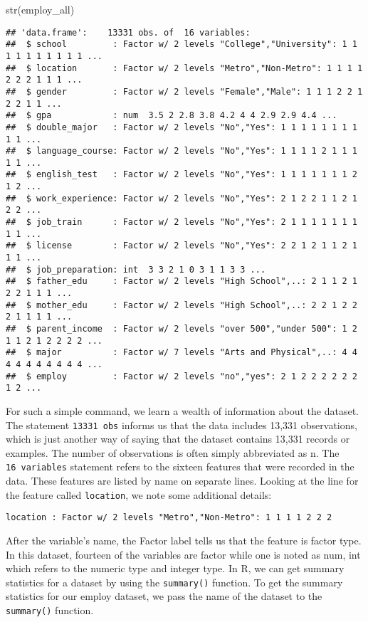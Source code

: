 \documentclass[
]{book}
\newenvironment{Shaded}{\begin{snugshade}}{\end{snugshade}}
\newcommand{\FunctionTok}[1]{\textcolor[rgb]{0.00,0.00,0.00}{#1}}
\newcommand{\NormalTok}[1]{#1}
\begin{document}
\begin{Shaded}
\begin{Highlighting}[]
\FunctionTok{str}\NormalTok{(employ\_all)}
\end{Highlighting}
\end{Shaded}

\begin{verbatim}
## 'data.frame':    13331 obs. of  16 variables:
##  $ school         : Factor w/ 2 levels "College","University": 1 1 1 1 1 1 1 1 1 1 ...
##  $ location       : Factor w/ 2 levels "Metro","Non-Metro": 1 1 1 1 2 2 2 1 1 1 ...
##  $ gender         : Factor w/ 2 levels "Female","Male": 1 1 1 2 2 1 2 2 1 1 ...
##  $ gpa            : num  3.5 2 2.8 3.8 4.2 4 4 2.9 2.9 4.4 ...
##  $ double_major   : Factor w/ 2 levels "No","Yes": 1 1 1 1 1 1 1 1 1 1 ...
##  $ language_course: Factor w/ 2 levels "No","Yes": 1 1 1 1 2 1 1 1 1 1 ...
##  $ english_test   : Factor w/ 2 levels "No","Yes": 1 1 1 1 1 1 1 2 1 2 ...
##  $ work_experience: Factor w/ 2 levels "No","Yes": 2 1 2 2 1 1 2 1 2 2 ...
##  $ job_train      : Factor w/ 2 levels "No","Yes": 2 1 1 1 1 1 1 1 1 1 ...
##  $ license        : Factor w/ 2 levels "No","Yes": 2 2 1 2 1 1 2 1 1 1 ...
##  $ job_preparation: int  3 3 2 1 0 3 1 1 3 3 ...
##  $ father_edu     : Factor w/ 2 levels "High School",..: 2 1 1 2 1 2 2 1 1 1 ...
##  $ mother_edu     : Factor w/ 2 levels "High School",..: 2 2 1 2 2 2 1 1 1 1 ...
##  $ parent_income  : Factor w/ 2 levels "over 500","under 500": 1 2 1 1 2 1 2 2 2 2 ...
##  $ major          : Factor w/ 7 levels "Arts and Physical",..: 4 4 4 4 4 4 4 4 4 4 ...
##  $ employ         : Factor w/ 2 levels "no","yes": 2 1 2 2 2 2 2 2 1 2 ...
\end{verbatim}

For such a simple command, we learn a wealth of information about the dataset.
The statement \texttt{13331\ obs} informs us that the data includes 13,331 observations, which is just another way of saying that the dataset contains 13,331 records or examples. The number of observations is often simply abbreviated as n.
The \texttt{16\ variables} statement refers to the sixteen features that were recorded in the data. These features are listed by name on separate lines. Looking at the line for the feature called \texttt{location}, we note some additional details:

\texttt{location\ :\ Factor\ w/\ 2\ levels\ "Metro","Non-Metro":\ 1\ 1\ 1\ 1\ 2\ 2\ 2}

After the variable's name, the Factor label tells us that the feature is factor type. In this dataset, fourteen of the variables are factor while one is noted as num, int which refers to the numeric type and integer type.
In R, we can get summary statistics for a dataset by using the \texttt{summary()} function. To get the summary statistics for our employ dataset, we pass the name of the dataset to the \texttt{summary()} function.
\end{document}
